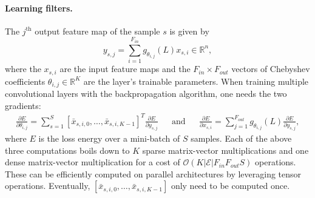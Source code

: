 \documentclass{article}
\newcommand{\E}{\mathcal{E}}
\newcommand{\bO}{\mathcal{O}}
\newcommand{\R}{\mathbb{R}}
\begin{document}
\paragraph{Learning filters.} The $j^\text{th}$ output feature map of the sample
$s$ is given by
\begin{equation} \label{eq:filterbank}
	y_{s,j} = \sum_{i=1}^{F_{in}} g_{\theta_{i,j}}(L) x_{s,i} \in \R^n,
\end{equation}
where the $x_{s,i}$ are the input feature maps and the $F_{in} \times F_{out}$ vectors of Chebyshev
coefficients $\theta_{i,j} \in \R^K$ are the layer's trainable parameters. When
training multiple convolutional layers with the backpropagation algorithm, one
needs the two gradients:
\begin{align}
	\frac{\partial E}{\partial \theta_{i,j}} =
	\sum_{s=1}^S [\bar{x}_{s,i,0}, \ldots, \bar{x}_{s,i,K-1}]^T
	\frac{\partial E}{\partial y_{s,j}}
	&& \text{and} &&
	\frac{\partial E}{\partial x_{s,i}} =
	\sum_{j=1}^{F_{out}} g_{\theta_{i,j}}(L)
	\frac{\partial E}{\partial y_{s,j}},
\end{align}
where $E$ is the loss energy over a mini-batch of $S$ samples. Each of the
above three computations boils down to $K$ sparse matrix-vector multiplications
and one dense matrix-vector multiplication for a cost of $\bO(K |\E| F_{in}
F_{out} S)$ operations. These can be efficiently computed on parallel
architectures by leveraging tensor operations. Eventually, $[\bar{x}_{s,i,0}, \ldots, \bar{x}_{s,i,K-1}]$ only need to be computed once.
\end{document}
